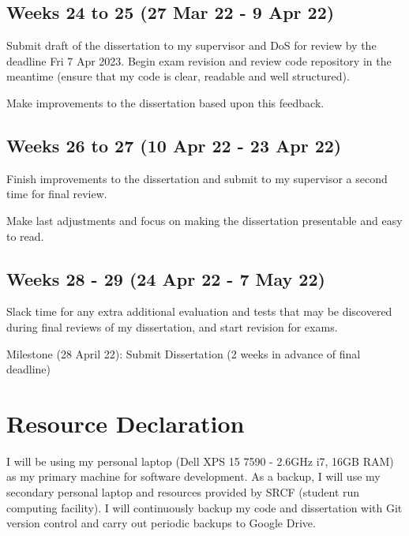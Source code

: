 \documentclass[12pt,a4paper,twoside]{article}
\begin{document}
\subsection*{Weeks 24 to 25 (27 Mar 22 - 9 Apr 22)}

Submit draft of the dissertation to my supervisor and DoS for review by the deadline Fri 7 Apr 2023. Begin exam revision and review code repository in the meantime (ensure that my code is clear, readable and well structured).

Make improvements to the dissertation based upon this feedback.

\subsection*{Weeks 26 to 27 (10 Apr 22 - 23 Apr 22)}

Finish improvements to the dissertation and submit to my supervisor a second time for final review. 

Make last adjustments and focus on making the dissertation presentable and easy to read. 

\subsection*{Weeks 28 - 29 (24 Apr 22 - 7 May 22)}

Slack time for any extra additional evaluation and tests that may be discovered during final reviews of my dissertation, and start revision for exams.

Milestone (28 April 22): Submit Dissertation (2 weeks in advance of final deadline)

\section{Resource Declaration}

I will be using my personal laptop (Dell XPS 15 7590 - 2.6GHz i7, 16GB RAM) as my primary machine for software development. As a backup, I will use my secondary personal laptop and resources provided by SRCF (student run computing facility). I will continuously backup my code and dissertation with Git version control and carry out periodic backups to Google Drive.


\newpage

\printbibliography[heading=subbibliography]

\appendix
\end{document}
